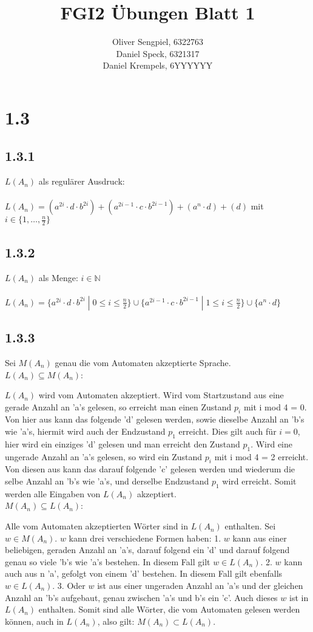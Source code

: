 \documentclass{article}
\title{FGI2 Übungen Blatt 1}
\author{Oliver Sengpiel, 6322763 \\ Daniel Speck, 6321317 \\ Daniel
Krempels, 6YYYYYY}
\begin{document}
\maketitle
\section*{1.3}
\subsection*{1.3.1} 
$L(A_n)$ als regulärer Ausdruck:
\\
\\
$L(A_n) = (a^{2i}\cdot d\cdot b^{2i}) + (a^{2i-1}\cdot c\cdot
b^{2i-1}) + (a^{n}\cdot d) + (d) $ mit $i \in \{1, \dots, \frac{n}{2}
\}$

\subsection*{1.3.2}
$L(A_n)$ als Menge: \hfill $i \in \mathbb{N}$
\\
\\
$L(A_n) = \{ a^{2i} \cdot d \cdot b^{2i} \;|\; 0 \leq i \leq \frac{n}{2} \}
\cup
\{ a^{2i-1} \cdot c \cdot b^{2i-1} \;|\; 1 \leq i \leq \frac{n}{2} \}
\cup
\{ a^n \cdot d \}$

\subsection*{1.3.3}
Sei $M(A_n)$ genau die vom Automaten akzeptierte Sprache. \\ $L(A_n)
\subseteq M(A_n)$: 

$L(A_n)$ wird vom Automaten akzeptiert. Wird vom Startzustand aus eine gerade
Anzahl an 'a's gelesen, so erreicht man einen Zustand $p_i$ mit i mod 4 = 0.
Von hier aus kann das folgende 'd' gelesen werden, sowie dieselbe Anzahl an 'b's
wie 'a's, hiermit wird auch der Endzustand $p_1$ erreicht. Dies gilt auch für
$i=0$, hier wird ein einziges 'd' gelesen und man erreicht den Zustand $p_1$.
Wird eine ungerade Anzahl an 'a's gelesen, so wird ein Zustand $p_i$ mit i mod 4
= 2 erreicht. Von diesen aus kann das darauf folgende 'c' gelesen werden und
wiederum die selbe Anzahl an 'b's wie 'a's, und derselbe Endzustand $p_1$ wird
erreicht. Somit werden alle Eingaben von $L(A_n)$ akzeptiert. \\ $M(A_n)
\subseteq L(A_n)$: 

Alle vom Automaten akzeptierten Wörter sind in $L(A_n)$ enthalten.  Sei $w \in
M(A_n)$. $w$ kann drei verschiedene Formen haben: 1. $w$ kann aus einer
beliebigen, geraden Anzahl an 'a's, darauf folgend ein 'd' und darauf folgend
genau so viele 'b's wie 'a's bestehen. In diesem Fall gilt $w \in L(A_n)$. 2.
$w$ kann auch aus n 'a', gefolgt von einem 'd' bestehen. In diesem Fall gilt
ebenfalls $w \in L(A_n)$. 3. Oder $w$ ist aus einer ungeraden Anzahl an 'a's und
der gleichen Anzahl an 'b's aufgebaut, genau zwischen 'a's und b's ein 'c'. Auch
dieses $w$ ist in $L(A_n)$ enthalten. Somit sind alle Wörter, die vom Automaten
gelesen werden können, auch in $L(A_n)$, also gilt: $M(A_n) \subset L(A_n)$. 
\end{document}
